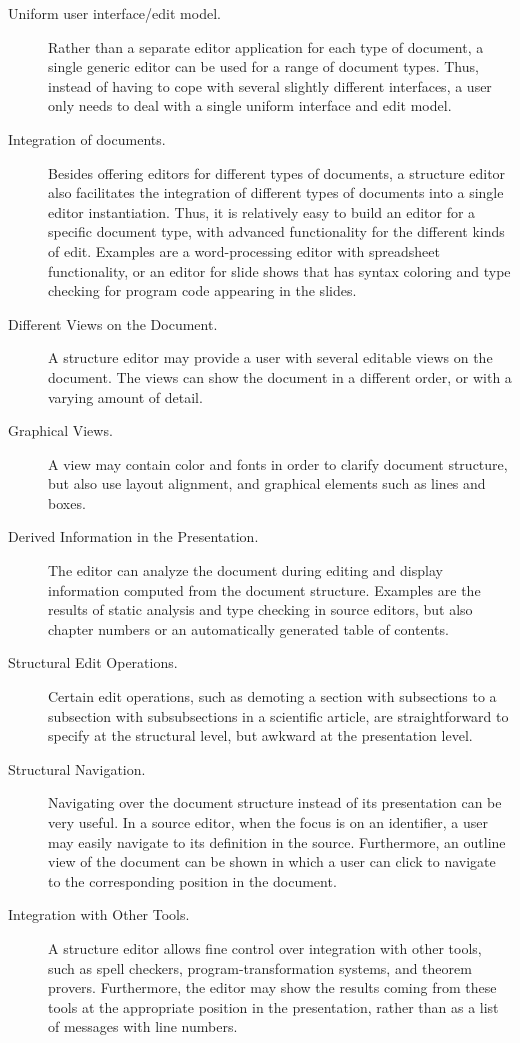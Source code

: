 \begin{description}
\item[Uniform user interface/edit model.] Rather than a separate editor application for each type of document, a single generic editor can be used for a range of document types. Thus, instead of having to cope with several slightly different interfaces, a user only needs to deal with a single uniform interface and edit model.

\item[Integration of documents.] Besides offering editors for different types of documents, a structure editor also facilitates the integration of different types of documents into a single editor instantiation. Thus, it is relatively easy to build an editor for a specific document type, with advanced functionality for the different kinds of edit. Examples are a word-processing editor with spreadsheet functionality, or an editor for slide shows that has syntax coloring and type checking for program code appearing in the slides.

\item[Different Views on the Document.] A structure editor may provide a user with several editable views on the document. The views can show the document in a different order, or with a varying amount of detail. 

\item[Graphical Views.] A view may contain color and fonts in order to clarify document structure, but also use layout alignment, and graphical elements such as lines and boxes.

\item[Derived Information in the Presentation.] The editor can analyze the document during editing and display information computed from the document structure. Examples are the results of static analysis and type checking in source editors, but also chapter numbers or an automatically generated table of contents.

\item[Structural Edit Operations.] Certain edit operations, such as demoting a section with subsections to a subsection with subsubsections in a scientific article, are straightforward to specify at the structural level, but awkward at the presentation level.

\item[Structural Navigation.] Navigating over the document structure instead of its presentation can be very useful. In a source editor, when the focus is on an identifier, a user may easily navigate to its definition in the source. Furthermore, an outline view of the document can be shown in which a user can click to navigate to the corresponding position in the document.

\item[Integration with Other Tools.] A structure editor allows fine control over integration with other tools, such as spell checkers, program-transformation systems, and theorem provers. Furthermore, the editor may show the results coming from these tools at the appropriate position in the presentation, rather than as a list of messages with line numbers.


\end{description}

